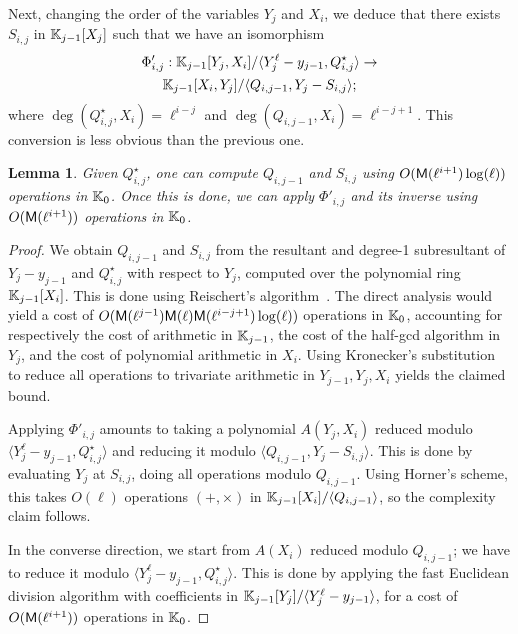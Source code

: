 \documentclass{sig-alternate}
\newtheorem{lemma}[definition]{Lemma}
\begin{document}
Next, changing the order of the variables $Y_j$ and $X_i$, we deduce
that there exists $S_{i,j}$ in $\mathbb{K}_{j-1}[X_j]$ such that we have an
isomorphism
\begin{multline*}
\Phi'_{i,j}: \mathbb{K}_{j-1}[Y_j,X_i]/\langle Y_j^\ell-y_{j-1}, Q^\star_{i,j}\rangle
\to\\ \mathbb{K}_{j-1}[X_i, Y_j]/\langle Q_{i,j-1}, Y_j-S_{i,j}\rangle;
\end{multline*}
where $\deg(Q^\star_{i,j},X_i)=\ell^{i-j}$ and
$\deg(Q_{i,j-1},X_i)=\ell^{i-j+1}$. This conversion is less obvious
than the previous one.
\begin{lemma}
  Given $Q^\star_{i,j}$, one can compute $Q_{i,j-1}$ and $S_{i,j}$
  using $O(\mathsf{M}(\ell^{i+1})\log(\ell))$ operations in $\mathbb{K}_0$.
  Once this is done, we can apply $\Phi'_{i,j}$ and its inverse 
  using $O(\mathsf{M}(\ell^{i+1}))$ operations in $\mathbb{K}_0$.
\end{lemma}
\begin{proof}
  We obtain $Q_{i,j-1}$ and $S_{i,j}$ from the resultant and degree-1
  subresultant of $Y_j-y_{j-1}$ and $Q^\star_{i,j}$ with respect to
  $Y_j$, computed over the polynomial ring $\mathbb{K}_{j-1}[X_i]$. This is
  done using Reischert's algorithm~\cite{Reischert97}. The direct
  analysis would yield a cost of
  $O(\mathsf{M}(\ell^{j-1})\mathsf{M}(\ell)\mathsf{M}(\ell^{i-j+1})\log(\ell))$
  operations in $\mathbb{K}_0$, accounting for respectively the cost of
  arithmetic in $\mathbb{K}_{j-1}$, the cost of the half-gcd algorithm in
  $Y_j$, and the cost of polynomial arithmetic in $X_i$. Using
  Kronecker's substitution to reduce all operations to trivariate
  arithmetic in $Y_{j-1},Y_j,X_i$ yields the claimed bound.

  Applying $\Phi'_{i,j}$ amounts to taking a polynomial $A(Y_j,X_i)$ 
  reduced modulo $\langle Y_j^\ell-y_{j-1}, Q^\star_{i,j}\rangle$
  and reducing it modulo $\langle Q_{i,j-1}, Y_j-S_{i,j}\rangle$. This
  is done by evaluating $Y_j$ at $S_{i,j}$, doing all operations
  modulo $Q_{i,j-1}$. Using Horner's scheme, this takes $O(\ell)$ 
  operations $(+,\times)$ in $\mathbb{K}_{j-1}[X_i]/\langle Q_{i,j-1}\rangle$,
  so the complexity claim follows.

  In the converse direction, we start from $A(X_i)$ reduced modulo
  $Q_{i,j-1}$; we have to reduce it modulo $\langle Y_j^\ell-y_{j-1},
  Q^\star_{i,j}\rangle$. This is done by applying the fast Euclidean
  division algorithm with coefficients in $\mathbb{K}_{j-1}[Y_j]/\langle
  Y_j^\ell-y_{j-1}\rangle$, for a cost of $O(\mathsf{M}(\ell^{i+1}))$
  operations in $\mathbb{K}_0$.
\end{proof}
\end{document}

